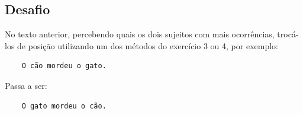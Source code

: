 \documentclass[10pt,a4paper,notitlepage]{article}
\begin{document}
\subsection*{Desafio}
No texto anterior, percebendo quais os dois sujeitos com mais ocorrências, trocá-los de posição utilizando um dos métodos do exercício 3 ou 4, por exemplo:
\begin{verbatim}
    O cão mordeu o gato.
\end{verbatim}
Passa a ser:
\begin{verbatim}
    O gato mordeu o cão.
\end{verbatim}
\end{document}
